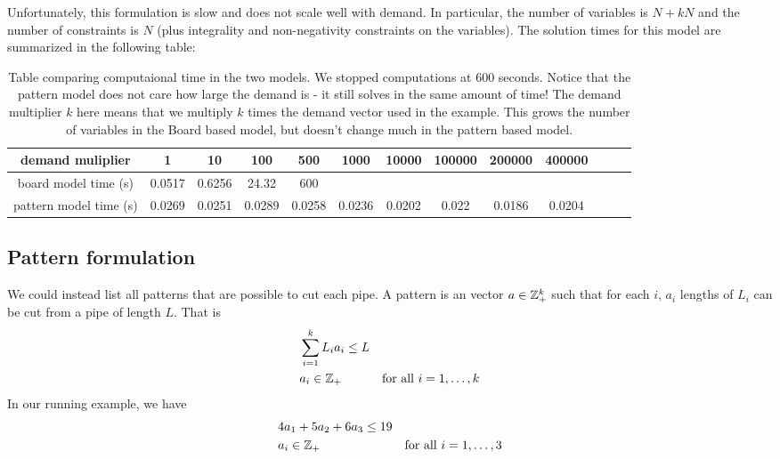 Unfortunately, this formulation is slow and does not scale well with demand.  In particular, the number of variables is $N + kN$ and the number of constraints is $N$ (plus integrality and non-negativity constraints on the variables).  
The solution times for this model are summarized in the following table:
\begin{table}
\begin{tabular}{ccccccccccccc}
\hline
demand muliplier & 1& 10& 100& 500& 1000& 10000& 100000& 200000& 400000\\
\hline
board model time (s) & 0.0517& 0.6256& 24.32& 600\\
pattern model time (s) & 0.0269&
 0.0251&
 0.0289&
 0.0258&
 0.0236&
 0.0202&
 0.022&
 0.0186&
 0.0204\\
 \hline
 \end{tabular}
 \caption{Table comparing computaional time in the two models.  We stopped computations at 600 seconds.   Notice that the pattern model does not care how large the demand is - it still solves in the same amount of time!  The demand multiplier $k$ here means that we multiply $k$ times the demand vector used in the example.  This grows the number of variables in the Board based model, but doesn't change much in the pattern based model.}
\end{table}

\subsection{Pattern formulation}
We could instead list all patterns that are possible to cut each pipe.   A pattern is an vector $a \in \mathbb{Z}^k_+$ such that for each $i$, $a_i$ lengths of $L_i$ can be cut from a pipe of length $L$.  That is
\begin{align*}
& \sum_{i=1}^k L_i a_i \leq L\\
& a_i \in \mathbb{Z}_+ & \mbox{for all } i=1, \dots, k
\end{align*}
In our running example, we have 
\begin{align*}
& 4 a_1 + 5 a_2 + 6 a_3 \leq 19\\
& a_i \in \mathbb{Z}_+ & \mbox{for all } i=1, \dots, 3
\end{align*}

